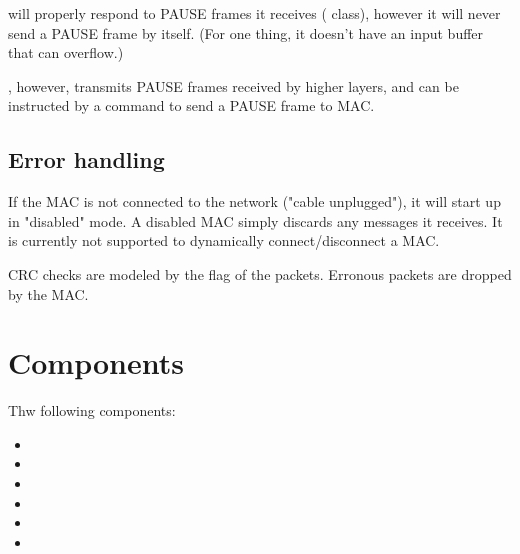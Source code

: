  will properly respond to PAUSE frames it receives
( class),
however it will never send a PAUSE frame by itself. (For one thing,
it doesn't have an input buffer that can overflow.)

, however, transmits PAUSE frames received by higher layers,
and  can be instructed by a command to send a PAUSE frame to MAC.


\subsection*{Error handling}

If the MAC is not connected to the network ("cable unplugged"), it will
start up in "disabled" mode. A disabled MAC simply discards any messages
it receives. It is currently not supported to dynamically connect/disconnect
a MAC.

CRC checks are modeled by the  flag of the packets. Erronous
packets are dropped by the MAC.




\section{Components}

Thw following components:

\begin{itemize}
  \item {}
  \item {}
  \item {}
  \item {}
  \item {}
  \item {}
\end{itemize}



